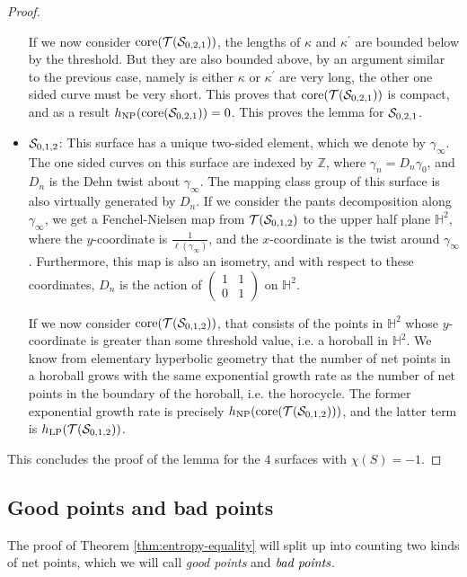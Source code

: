 \documentclass[12pt, reqno]{amsart}
\begin{document}
\begin{proof}
\begin{itemize}
    If we now consider $\mathrm{core}(\mathcal{T}(\mathcal{S}_{0,2,1}))$, the lengths of $\kappa$ and $\kappa^{\prime}$ are bounded below by the threshold.
    But they are also bounded above, by an argument similar to the previous case, namely is either $\kappa$ or $\kappa^{\prime}$ are very long, the other one sided curve must be very short.
    This proves that $\mathrm{core}(\mathcal{T}(\mathcal{S}_{0,2,1}))$ is compact, and as a result $h_{\mathrm{NP}}(\mathrm{core}(\mathcal{S}_{0,2,1})) = 0$.
    This proves the lemma for $\mathcal{S}_{0,2,1}$.
  \item $\mathcal{S}_{0,1,2}$: This surface has a unique two-sided element, which we denote by $\gamma_{\infty}$.
    The one sided curves on this surface are indexed by $\mathbb{Z}$, where $\gamma_n = D_n \gamma_0$, and $D_n$ is the Dehn twist about $\gamma_\infty$.
    The mapping class group of this surface is also virtually generated by $D_n$.
    If we consider the pants decomposition along $\gamma_{\infty}$, we get a Fenchel-Nielsen map from $\mathcal{T}(\mathcal{S}_{0,1,2})$ to the upper half plane $\mathbb{H}^2$, where the $y$-coordinate is $\frac{1}{\ell(\gamma_{\infty})}$, and the $x$-coordinate is the twist around $\gamma_{\infty}$.
    Furthermore, this map is also an isometry, and with respect to these coordinates, $D_n$ is the action of $
    \begin{pmatrix}
      1 & 1 \\
      0 & 1
    \end{pmatrix}
    $ on $\mathbb{H}^2$.

    If we now consider $\mathrm{core}(\mathcal{T}(\mathcal{S}_{0,1,2}))$, that consists of the points in $\mathbb{H}^2$ whose $y$-coordinate is greater than some threshold value, i.e. a horoball in $\mathbb{H}^2$.
    We know from elementary hyperbolic geometry that the number of net points in a horoball grows with the same exponential growth rate as the number of net points in the boundary of the horoball, i.e. the horocycle.
    The former exponential growth rate is precisely $h_{\mathrm{NP}}(\mathrm{core}(\mathcal{T}(\mathcal{S}_{0,1,2})))$, and the latter term is $h_{\mathrm{LP}}(\mathcal{T}(\mathcal{S}_{0,1,2}))$.
  \end{itemize}
  This concludes the proof of the lemma for the $4$ surfaces with $\chi(S) = -1$.
\end{proof}

\subsection{Good points and bad points}
\label{sec:good-points-bad}

The proof of Theorem \ref{thm:entropy-equality} will split up into counting two kinds of net points, which we will call \emph{good points} and $\emph{bad points}$.
\end{document}
